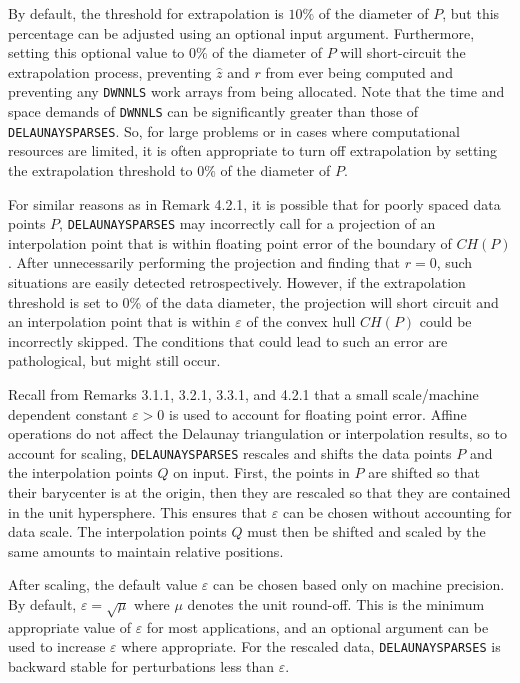 By default, the threshold for extrapolation is $10\%$ of the diameter of
$P$, but this percentage can be adjusted using an optional input argument.
Furthermore, setting this optional value to $0\%$ of the diameter of $P$
will short-circuit the extrapolation process, preventing ${\hat z}$
and $r$ from ever being computed and preventing any {\tt DWNNLS}
work arrays from being allocated. Note that the time and space demands
of {\tt DWNNLS} can be significantly greater than those of
{\tt DELAUNAYSPARSES}. So, for large problems or in cases where
computational resources are limited, it is often appropriate to turn off
extrapolation by setting the extrapolation threshold to $0\%$ of the
diameter of $P$.

\enspace
For similar reasons as in Remark 4.2.1, it is possible that for poorly
spaced data points $P$, {\tt DELAUNAYSPARSES} may incorrectly call for
a projection of an interpolation point that is within floating point
error of the boundary of $CH(P)$. After unnecessarily performing the
projection and finding that $r=0$, such situations are easily
detected retrospectively. However, if the extrapolation threshold is
set to 0\% of the data diameter, the projection will short circuit
and an interpolation point that is within $\varepsilon$ of the convex
hull $CH(P)$ could be incorrectly skipped. The conditions that could
lead to such an error are pathological, but might still occur.
\medskip


Recall from Remarks 3.1.1, 3.2.1, 3.3.1, and 4.2.1 that a small
scale/machine dependent constant $\varepsilon > 0$ is used to account
for floating point error. Affine operations do not affect the Delaunay
triangulation or interpolation results, so to account for scaling, 
{\tt DELAUNAYSPARSES} rescales and shifts the data points $P$ and
the interpolation points $Q$ on input. First, the points in $P$ are
shifted so that their barycenter is at the origin, then they are rescaled
so that they are contained in the unit hypersphere. This ensures
that $\varepsilon$ can be chosen without accounting for data scale.
The interpolation points $Q$ must then be shifted and scaled by the same
amounts to maintain relative positions.

After scaling, the default value $\varepsilon$ can be chosen based
only on machine precision. By default, $\varepsilon = \sqrt{\mu}$
where $\mu$ denotes the unit round-off. This is the minimum appropriate
value of $\varepsilon$ for most applications, and an optional argument
can be used to increase $\varepsilon$ where appropriate. For the rescaled
data, {\tt DELAUNAYSPARSES} is backward stable for perturbations less
than $\varepsilon$.

